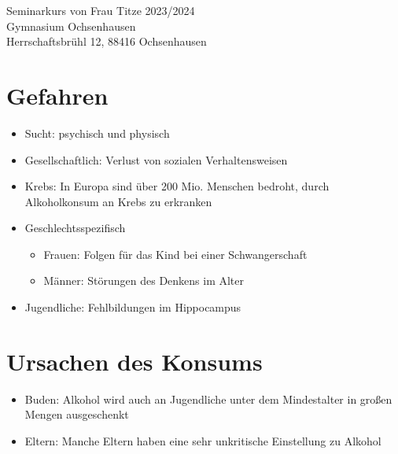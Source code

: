 \documentclass[12pt]{article}
\begin{document}
\begin{titlepage}
\begin{center}
%
%
%
%
%
%
%
        \vspace{2cm}
        Seminarkurs von Frau Titze 2023/2024\\
        Gymnasium Ochsenhausen\\
        Herrschaftsbrühl 12, 88416 Ochsenhausen\\
             
    \end{center}
 \end{titlepage}

 \clearpage

 \section*{Gefahren}
 \begin{itemize}
    \item Sucht: psychisch und physisch
    \item Gesellschaftlich: Verlust von sozialen Verhaltensweisen
    \item Krebs: In Europa sind über 200 Mio. Menschen bedroht, durch Alkoholkonsum an Krebs zu erkranken
    \item Geschlechtsspezifisch
        \begin{itemize}[nosep]
            \item Frauen: Folgen für das Kind bei einer Schwangerschaft
            \item Männer: Störungen des Denkens im Alter
        \end{itemize}
    \item Jugendliche: Fehlbildungen im Hippocampus
 \end{itemize}

 \section*{Ursachen des Konsums}
 \begin{itemize}
    \item Buden: Alkohol wird auch an Jugendliche unter dem Mindestalter in großen Mengen ausgeschenkt 
    \item Eltern: Manche Eltern haben eine sehr unkritische Einstellung zu Alkohol
 \end{itemize}
\end{document}
